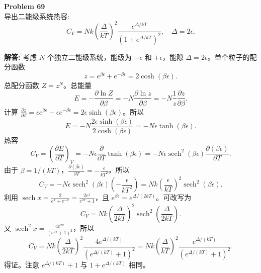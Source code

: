 \documentclass[12pt, a4paper, oneside]{ctexart}
\newenvironment{solution}{\par\noindent\textbf{解答:}\quad}{\par}
\begin{document}
\begin{mdframed}[backgroundcolor=gray!10, linewidth=0pt]
    \textbf{Problem 69} \\
    导出二能级系统热容:
    \[
    C_V = N k \left( \frac{\Delta}{kT} \right)^2 \frac{e^{\Delta / kT}}{(1 + e^{\Delta / kT})^2}, \quad \Delta = 2\epsilon.
    \]
\end{mdframed}
\begin{solution}
    考虑 $N$ 个独立二能级系统，能级为 $-\epsilon$ 和 $+\epsilon$，能隙 $\Delta = 2\epsilon$。单个粒子的配分函数
    \[
    z = e^{\beta \epsilon} + e^{-\beta \epsilon} = 2 \cosh(\beta \epsilon).
    \]
    总配分函数 $Z = z^N$。总能量
    \[
    E = -\frac{\partial \ln Z}{\partial \beta} = -N \frac{\partial \ln z}{\partial \beta} = -N \frac{1}{z} \frac{\partial z}{\partial \beta}.
    \]
    计算 $\frac{\partial z}{\partial \beta} = \epsilon e^{\beta \epsilon} - \epsilon e^{-\beta \epsilon} = 2\epsilon \sinh(\beta \epsilon)$。所以
    \[
    E = -N \frac{2\epsilon \sinh(\beta \epsilon)}{2 \cosh(\beta \epsilon)} = -N \epsilon \tanh(\beta \epsilon).
    \]
    热容
    \[
    C_V = \left( \frac{\partial E}{\partial T} \right)_V = -N \epsilon \frac{\partial}{\partial T} \tanh(\beta \epsilon) = -N \epsilon \operatorname{sech}^2(\beta \epsilon) \frac{\partial (\beta \epsilon)}{\partial T}.
    \]
    由于 $\beta = 1/(kT)$，$\frac{\partial (\beta \epsilon)}{\partial T} = -\frac{\epsilon}{k T^2}$。所以
    \[
    C_V = -N \epsilon \operatorname{sech}^2(\beta \epsilon) \left( -\frac{\epsilon}{k T^2} \right) = N k \left( \frac{\epsilon}{kT} \right)^2 \operatorname{sech}^2(\beta \epsilon).
    \]
    利用 $\operatorname{sech} x = \frac{2}{e^x + e^{-x}} = \frac{2 e^x}{e^{2x} + 1}$，且 $e^{\beta \epsilon} = e^{\Delta/(2kT)}$。可改写为
    \[
    C_V = N k \left( \frac{\Delta}{2kT} \right)^2 \operatorname{sech}^2\left( \frac{\Delta}{2kT} \right).
    \]
    又 $\operatorname{sech}^2 x = \frac{4 e^{2x}}{(e^{2x} + 1)^2}$，所以
    \[
    C_V = N k \left( \frac{\Delta}{2kT} \right)^2 \frac{4 e^{\Delta/(kT)}}{(e^{\Delta/(kT)} + 1)^2} = N k \left( \frac{\Delta}{kT} \right)^2 \frac{e^{\Delta/(kT)}}{(e^{\Delta/(kT)} + 1)^2}.
    \]
    得证。注意 $e^{\Delta/(kT)} + 1$ 与 $1 + e^{\Delta/(kT)}$ 相同。
\end{solution}
\end{document}
